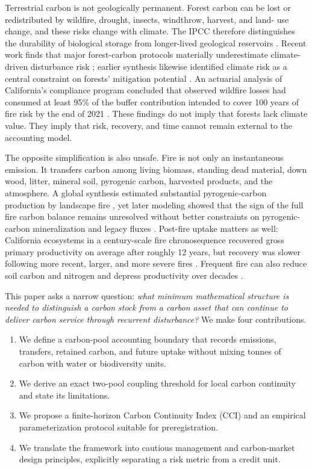 \documentclass[10pt]{article}
\begin{document}
Terrestrial carbon is not geologically permanent.  Forest carbon can be lost
or redistributed by wildfire, drought, insects, windthrow, harvest, and land-
use change, and these risks change with climate.  The IPCC therefore
distinguishes the durability of biological storage from longer-lived geological
reservoirs \cite{ipcc2022}.  Recent work finds that major forest-carbon
protocols materially underestimate climate-driven disturbance risk
\cite{wu2026}; earlier synthesis likewise identified climate risk as a central
constraint on forests' mitigation potential \cite{anderegg2020}.  An actuarial
analysis of California's compliance program concluded that observed wildfire
losses had consumed at least 95\% of the buffer contribution intended to cover
100 years of fire risk by the end of 2021 \cite{badgley2022}.  These findings do
not imply that forests lack climate value.  They imply that risk, recovery, and
time cannot remain external to the accounting model.

The opposite simplification is also unsafe.  Fire is not only an instantaneous
emission.  It transfers carbon among living biomass, standing dead material,
down wood, litter, mineral soil, pyrogenic carbon, harvested products, and the
atmosphere.  A global synthesis estimated substantial pyrogenic-carbon
production by landscape fire \cite{jones2019}, yet later modeling showed that
the sign of the full fire carbon balance remains unresolved without better
constraints on pyrogenic-carbon mineralization and legacy fluxes
\cite{bowring2022}.  Post-fire uptake matters as well: California ecosystems in
a century-scale fire chronosequence recovered gross primary productivity on
average after roughly 12 years, but recovery was slower following more recent,
larger, and more severe fires \cite{hemes2023}.  Frequent fire can also reduce
soil carbon and nitrogen and depress productivity over decades
\cite{pellegrini2018}.

This paper asks a narrow question: \emph{what minimum mathematical structure is
needed to distinguish a carbon stock from a carbon asset that can continue to
deliver carbon service through recurrent disturbance?}  We make four
contributions.

\begin{enumerate}
\item We define a carbon-pool accounting boundary that records emissions,
transfers, retained carbon, and future uptake without mixing tonnes of carbon
with water or biodiversity units.
\item We derive an exact two-pool coupling threshold for local carbon
continuity and state its limitations.
\item We propose a finite-horizon Carbon Continuity Index (CCI) and an empirical
parameterization protocol suitable for preregistration.
\item We translate the framework into cautious management and carbon-market
design principles, explicitly separating a risk metric from a credit unit.
\end{enumerate}
\end{document}
